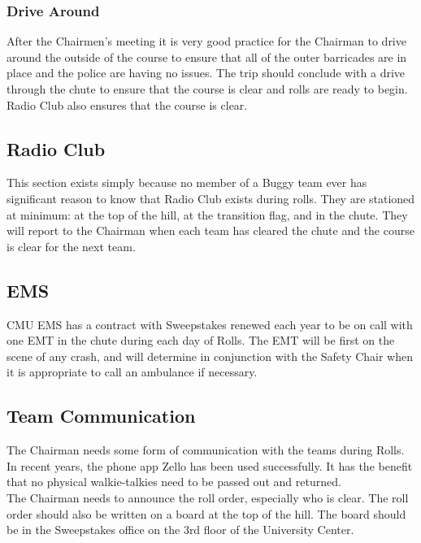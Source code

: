 \subsubsection{Drive Around}
After the Chairmen's meeting it is very good practice for the Chairman to
drive around the outside of the course to ensure that all of the outer
barricades are in place and the police are having no issues. The trip
should conclude with a drive through the chute to ensure that the course is
clear and rolls are ready to begin. Radio Club also ensures that the course is
clear.

\subsection{Radio Club}
This section exists simply because no member of a Buggy team ever has
significant reason to know that Radio Club exists during rolls.
They are stationed at minimum: at the top of the hill, at the transition
flag, and in the chute. They will report to the Chairman when each team
has cleared the chute and the course is clear for the next team.

\subsection{EMS}
CMU EMS has a contract with Sweepstakes renewed each year to be on call
with one EMT in the chute during each day of Rolls. The EMT will be first
on the scene of any crash, and will determine in conjunction with the
Safety Chair when it is appropriate to call an ambulance if necessary.

\subsection{Team Communication}
The Chairman needs some form of communication with the teams during Rolls.
In recent years, the phone app Zello has been used successfully. It has
the benefit that no physical walkie-talkies need to be passed out and returned.
\\
The Chairman needs to announce the roll order, especially who is clear.
The roll order should also be written on a board at the top of the hill.
The board should be in the Sweepstakes office on the 3rd floor of the
University Center.

